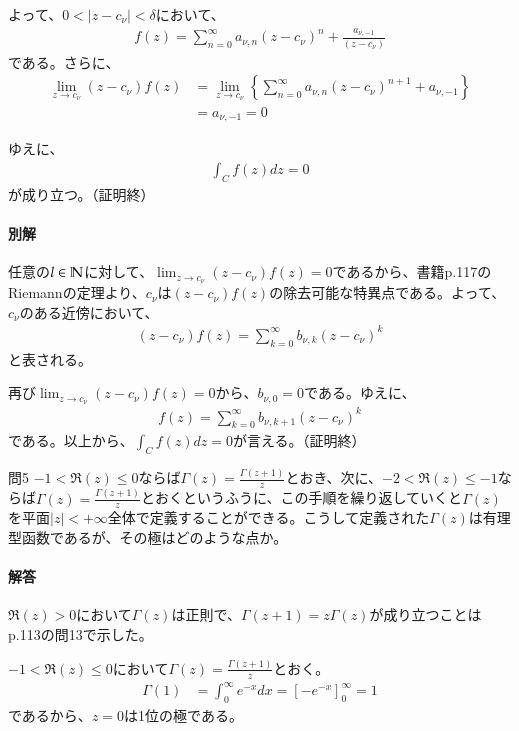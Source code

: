 よって、$0<|z-c_\nu|<\delta$において、
\begin{align*}
    f(z)
    =\sum_{n=0}^{\infty}a_{\nu,n}(z-c_\nu)^n
    +\frac{a_{\nu,-1}}{(z-c_\nu)}
\end{align*}
である。さらに、
\begin{align*}
    \lim_{z\longrightarrow c_\nu}(z-c_\nu)f(z)
    &=\lim_{z\longrightarrow c_\nu}\left\{\sum_{n=0}^{\infty}a_{\nu,n}(z-c_\nu)^{n+1}
    +a_{\nu,-1}\right\}\\
    &=a_{\nu,-1}=0
\end{align*}


ゆえに、
\begin{align*}
    \int_Cf(z)dz=0
\end{align*}
が成り立つ。（証明終）

\paragraph{別解}
任意の$l\in\mathbb{N}$に対して、$\lim_{z\longrightarrow c_\nu}(z-c_\nu)f(z)=0$であるから、書籍p.117のRiemannの定理より、$c_\nu$は$(z-c_\nu)f(z)$の除去可能な特異点である。よって、$c_\nu$のある近傍において、
\begin{align*}
    (z-c_\nu)f(z)
    =\sum_{k=0}^{\infty}b_{\nu,k}(z-c_\nu)^k
\end{align*}
と表される。

再び$\lim_{z\longrightarrow c_\nu}(z-c_\nu)f(z)=0$から、$b_{\nu,0}=0$である。ゆえに、
\begin{align*}
    f(z)
    =\sum_{k=0}^{\infty}b_{\nu,k+1}(z-c_\nu)^k
\end{align*}
である。以上から、$\int_Cf(z)dz=0$が言える。（証明終）

\begin{mysimplebox}{問5}
    $-1<\Re(z)\le0$ならば$\Gamma(z)=\frac{\Gamma(z+1)}{z}$とおき、次に、$-2<\Re(z)\le-1$ならば$\Gamma(z)=\frac{\Gamma(z+1)}{z}$とおくというふうに、この手順を繰り返していくと$\Gamma(z)$を平面$|z|<+\infty$全体で定義することができる。こうして定義された$\Gamma(z)$は有理型函数であるが、その極はどのような点か。
\end{mysimplebox}
\paragraph{解答}
$\Re(z)>0$において$\Gamma(z)$は正則で、$\Gamma(z+1)=z\Gamma(z)$が成り立つことはp.113の問13で示した。

$-1<\Re(z)\le0$において$\Gamma(z)=\frac{\Gamma(z+1)}{z}$とおく。
\begin{align*}
    \Gamma(1)
    &=\int_{0}^{\infty}e^{-x}dx=\left[-e^{-x}\right]_0^\infty=1
\end{align*}
であるから、$z=0$は1位の極である。

